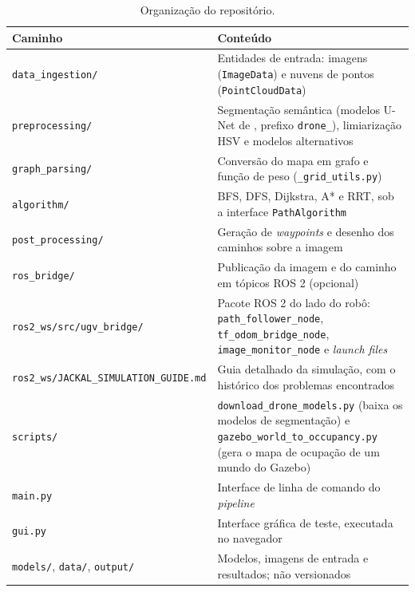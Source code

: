 \documentclass[
    12pt,
    openright,
    oneside,
    a4paper,
    english,
    brazil
]{abntex2}
\begin{document}
\begin{apendicesenv}
\begin{table}[htbp]
    \centering
    \caption{Organização do repositório.}
    \label{tab:repositorio}
    \footnotesize
    \renewcommand{\arraystretch}{1.2}
    \begin{tabular}{>{\raggedright\arraybackslash}p{5.1cm} >{\raggedright\arraybackslash}p{9.7cm}}
        \toprule
        \textbf{Caminho} & \textbf{Conteúdo} \\
        \midrule
        \texttt{data\_ingestion/} & Entidades de entrada: imagens (\texttt{ImageData}) e nuvens de pontos (\texttt{PointCloudData}) \\
        \texttt{preprocessing/} & Segmentação semântica (modelos U-Net de \cite{junior2024_models}, prefixo \texttt{drone\_}), limiarização HSV e modelos alternativos \\
        \texttt{graph\_parsing/} & Conversão do mapa em grafo e função de peso (\texttt{\_grid\_utils.py}) \\
        \texttt{algorithm/} & BFS, DFS, Dijkstra, A* e RRT, sob a interface \texttt{PathAlgorithm} \\
        \texttt{post\_processing/} & Geração de \textit{waypoints} e desenho dos caminhos sobre a imagem \\
        \texttt{ros\_bridge/} & Publicação da imagem e do caminho em tópicos ROS 2 (opcional) \\
        \texttt{ros2\_ws/\allowbreak{}src/\allowbreak{}ugv\_bridge/} & Pacote ROS 2 do lado do robô: \texttt{path\_follower\_node}, \texttt{tf\_odom\_bridge\_node}, \texttt{image\_monitor\_node} e \textit{launch files} \\
        \texttt{ros2\_ws/\allowbreak{}JACKAL\_SIMULATION\_GUIDE.md} & Guia detalhado da simulação, com o histórico dos problemas encontrados \\
        \texttt{scripts/} & \texttt{download\_drone\_models.py} (baixa os modelos de segmentação) e \texttt{gazebo\_world\_to\_occupancy.py} (gera o mapa de ocupação de um mundo do Gazebo) \\
        \texttt{main.py} & Interface de linha de comando do \textit{pipeline} \\
        \texttt{gui.py} & Interface gráfica de teste, executada no navegador \\
        \texttt{models/}, \texttt{data/}, \texttt{output/} & Modelos, imagens de entrada e resultados; não versionados \\
        \bottomrule
    \end{tabular}
\end{table}


\end{apendicesenv}
\end{document}
